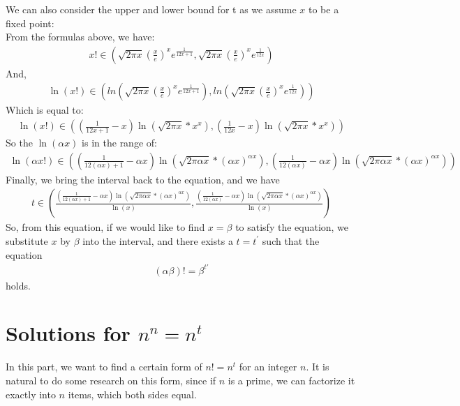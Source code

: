 \documentclass{article}
\begin{document}
        We can also consider the upper and lower bound for t as we assume $x$ to be a fixed point:\\

        From the formulas above, we have:
            \begin{align*}
                x! \in (\sqrt{2\pi x} (\frac{x}{e})^x e^{\frac{1}{12x+1}},\sqrt{2\pi x} (\frac{x}{e})^x e^{\frac{1}{12x}})
            \end{align*}
        And,
            \begin{align*}
                \ln(x!) \in (ln(\sqrt{2\pi x} (\frac{x}{e})^x e^{\frac{1}{12x+1}}),ln(\sqrt{2\pi x} (\frac{x}{e})^x e^{\frac{1}{12x}}))
            \end{align*}
        Which is equal to:
            \begin{align*}
               \ln(x!) \in ((\frac{1}{12x+1} - x)\ln(\sqrt{2 \pi x} * x^x),(\frac{1}{12x} - x)\ln(\sqrt{2 \pi x} * x^x))
            \end{align*}
        So the $\ln(\alpha x)$ is in the range of:
            \begin{align*}
               \ln(\alpha x!) \in ((\frac{1}{12(\alpha x)+1} - \alpha x)\ln(\sqrt{2 \pi \alpha x} * (\alpha x)^{\alpha x}),(\frac{1}{12(\alpha x)} - \alpha x)\ln(\sqrt{2 \pi \alpha x} * (\alpha x)^{\alpha x}))
            \end{align*}
        Finally, we bring the interval back to the equation, and we have 
            \begin{align*}
               t \in (\frac{(\frac{1}{12(\alpha x)+1} - \alpha x)\ln(\sqrt{2 \pi \alpha x} * (\alpha x)^{\alpha x})}{\ln(x)},\frac{(\frac{1}{12(\alpha x)} - \alpha x)\ln(\sqrt{2 \pi \alpha x} * (\alpha x)^{\alpha x})}{\ln(x)})
            \end{align*}
        So, from this equation, if we would like to find $x = \beta$ to satisfy the equation, we substitute $x$ by $\beta$ into the interval, and there exists a $t = t^{'}$ such that the equation
            \begin{align*}
               (\alpha \beta)! = \beta ^ {t'}
            \end{align*}
        holds.

        \section{Solutions for $n^n=n^t$}
        In this part, we want to find a certain form of $n!=n^t$ for an integer $n$. It is natural to do some research on this form, since if $n$ is a prime, we can factorize it exactly into $n$ items, which both sides equal.
        
\end{document}
